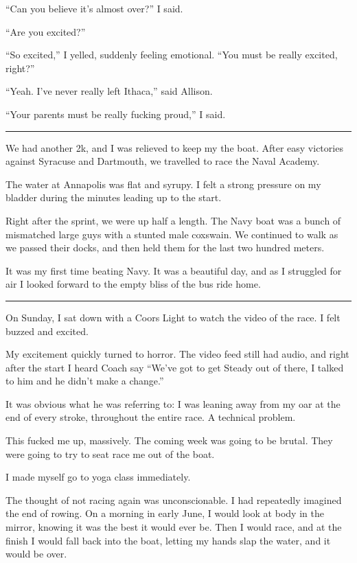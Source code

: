 ``Can you believe it's almost over?'' I said.

``Are you excited?''

``So excited,'' I yelled, suddenly feeling emotional.  ``You must be
really excited, right?''

``Yeah.  I've never really left Ithaca,'' said Allison.

``Your parents must be really fucking proud,'' I said.

\plainfancybreak{12pt}{2}{}

We had another 2k, and I was relieved to keep my the boat.  After easy victories
against Syracuse and Dartmouth, we travelled to race the Naval Academy.  

The water at Annapolis was flat and syrupy.  I felt a strong pressure on my
bladder during the minutes leading up to the start.  

Right after the sprint, we were up half a length.  The Navy boat was a bunch of
mismatched large guys with a stunted male coxswain.  We continued to walk as we
passed their docks, and then held them for the last two hundred meters.

It was my first time beating Navy.  It was a beautiful day, and as I struggled
for air I looked forward to the empty bliss of the bus ride home.

\plainfancybreak{12pt}{2}{}

On Sunday, I sat down with a Coors Light to watch the video of the race.  I felt
buzzed and excited. 

My excitement quickly turned to horror.  The video feed still had audio, and
right after the start I heard Coach say ``We've got to get Steady out of there,
I talked to him and he didn't make a change.''  

It was obvious what he was referring to: I was leaning away from my oar at the
end of every stroke, throughout the entire race.  A technical problem.

This fucked me up, massively.  The coming week was going to be brutal.  They
were going to try to seat race me out of the boat.

I made myself go to yoga class immediately.  

The thought of not racing again was unconscionable.  I had repeatedly imagined
the end of rowing.  On a morning in early June, I would look at body in the
mirror, knowing it was the best it would ever be.  Then I would race, and at the
finish I would fall back into the boat, letting my hands slap the water, and it
would be over.

